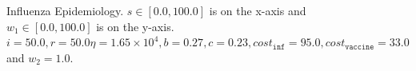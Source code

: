 \begin{figure}[h!]
    \centering
    \caption{Influenza Epidemiology. $ s \in \left[ 0.0, 100.0 \right]$ is on the x-axis and $ w_1 \in \left[ 0.0, 100.0 \right]$ is on the y-axis. $ i = 50.0, r = 50.0 \eta = 1.65 \times 10^4, b = 0.27, c = 0.23, cost_{\mathtt{inf}} = 95.0, cost_{\mathtt{vaccine}} = 33.0$ and $w_2 = 1.0 $.}
    \label{fig:robot1d}
\end{figure}


